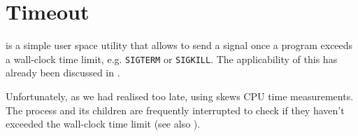 
\section{Timeout}

\cite{man-1-timeout} is a simple user space utility that allows to send a
signal once a program exceeds a wall-clock time limit, e.g. \texttt{SIGTERM} or
\texttt{SIGKILL}. The applicability of this has already been discussed in
.

Unfortunately, as we had realised too late, using \cite{man-1-timeout} skews
CPU time measurements. The process and its children are frequently interrupted
to check if they haven't exceeded the wall-clock time limit (see also
).
